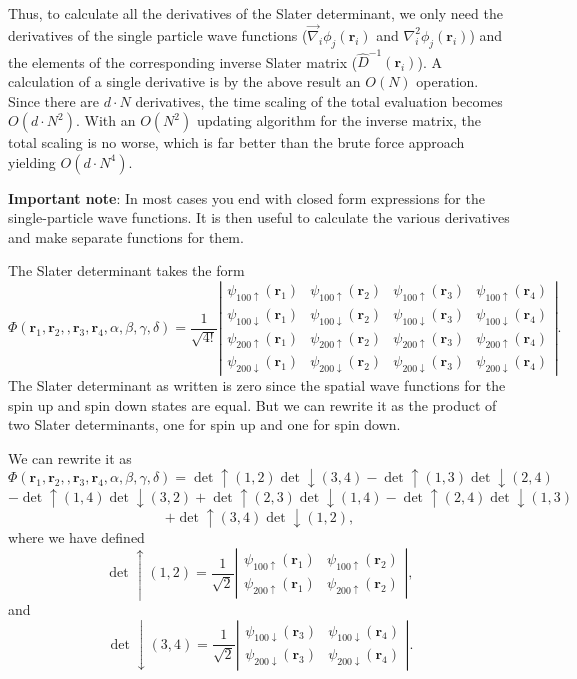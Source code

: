 Thus, to calculate all the derivatives of the Slater determinant, we
only need the derivatives of the single particle  wave functions
($\vec\nabla_i \phi_j(\mathbf{r}_i)$ and $\nabla^2_i \phi_j(\mathbf{r}_i)$)
and the elements of the corresponding inverse Slater matrix ($\hat{D}^{-1}(\mathbf{r}_i)$). A calculation of a single derivative is by the
above result an $O(N)$ operation. Since there are $d\cdot N$
derivatives, the time scaling of the total evaluation becomes
$O(d\cdot N^2)$. With an $O(N^2)$ updating algorithm for the
inverse matrix, the total scaling is no worse, which is far better
than the brute force approach yielding $O(d\cdot N^4)$.

\textbf{Important note}: In most cases you end with closed form expressions for the single-particle  wave functions. It is then useful to calculate the various derivatives and make separate functions
for them.

The Slater determinant takes the form  
\[
   \Phi(\mathbf{r}_1,\mathbf{r}_2,,\mathbf{r}_3,\mathbf{r}_4, \alpha,\beta,\gamma,\delta)=\frac{1}{\sqrt{4!}}
\left| \begin{array}{cccc} \psi_{100\uparrow}(\mathbf{r}_1)& \psi_{100\uparrow}(\mathbf{r}_2)& \psi_{100\uparrow}(\mathbf{r}_3)&\psi_{100\uparrow}(\mathbf{r}_4) \\
\psi_{100\downarrow}(\mathbf{r}_1)& \psi_{100\downarrow}(\mathbf{r}_2)& \psi_{100\downarrow}(\mathbf{r}_3)&\psi_{100\downarrow}(\mathbf{r}_4) \\
\psi_{200\uparrow}(\mathbf{r}_1)& \psi_{200\uparrow}(\mathbf{r}_2)& \psi_{200\uparrow}(\mathbf{r}_3)&\psi_{200\uparrow}(\mathbf{r}_4) \\
\psi_{200\downarrow}(\mathbf{r}_1)& \psi_{200\downarrow}(\mathbf{r}_2)& \psi_{200\downarrow}(\mathbf{r}_3)&\psi_{200\downarrow}(\mathbf{r}_4) \end{array} \right|.
\]
The Slater determinant as written is zero since the spatial wave functions for the spin up and spin down 
states are equal.  
But we can rewrite it as the product of two Slater determinants, one for spin up and one for spin down.

We can rewrite it as 
\[
   \Phi(\mathbf{r}_1,\mathbf{r}_2,,\mathbf{r}_3,\mathbf{r}_4, \alpha,\beta,\gamma,\delta)=\det\uparrow(1,2)\det\downarrow(3,4)-\det\uparrow(1,3)\det\downarrow(2,4)
\]
\[
-\det\uparrow(1,4)\det\downarrow(3,2)+\det\uparrow(2,3)\det\downarrow(1,4)-\det\uparrow(2,4)\det\downarrow(1,3)
\]
\[
+\det\uparrow(3,4)\det\downarrow(1,2),
\]
where we have defined
\[
\det\uparrow(1,2)=\frac{1}{\sqrt{2}}\left| \begin{array}{cc} \psi_{100\uparrow}(\mathbf{r}_1)& \psi_{100\uparrow}(\mathbf{r}_2)\\
\psi_{200\uparrow}(\mathbf{r}_1)& \psi_{200\uparrow}(\mathbf{r}_2) \end{array} \right|,
\]
and 
\[
\det\downarrow(3,4)=\frac{1}{\sqrt{2}}\left| \begin{array}{cc} \psi_{100\downarrow}(\mathbf{r}_3)& \psi_{100\downarrow}(\mathbf{r}_4)\\
\psi_{200\downarrow}(\mathbf{r}_3)& \psi_{200\downarrow}(\mathbf{r}_4) \end{array} \right|.
\]

